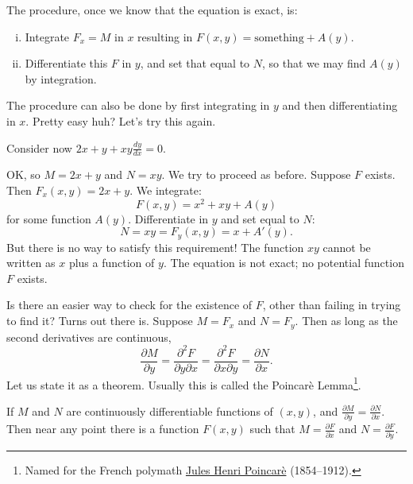 \documentclass[12pt]{book}
\begin{document}
The procedure, once we know that the equation is exact, is:
\begin{enumerate}[(i)]
\item Integrate $F_x = M$ in $x$ resulting in $F(x,y) = \text{something} + A(y)$.
\item Differentiate this $F$ in $y$, and set that equal to
$N$, so that we may find $A(y)$ by integration.
\end{enumerate}
The procedure can also be done by first integrating in $y$ and then
differentiating in $x$.
Pretty easy huh?  Let's try this again.

\begin{example}
Consider now $2x+y + xy \frac{dy}{dx} = 0$.

OK, so $M = 2x+y$ and $N=xy$.  We try to proceed as before.
Suppose 
$F$ exists.  Then $F_x (x,y) = 2x+y$.
We integrate:
\begin{equation*}
F(x,y) = x^2 + xy + A(y)
\end{equation*}
for some function $A(y)$.  Differentiate in $y$ and set equal to $N$:
\begin{equation*}
N = xy = F_y (x,y) = x+A'(y) .
\end{equation*}
But there is no way to satisfy this requirement!  The function $xy$ cannot
be written as $x$ plus a function of $y$.  The equation is not
exact; no potential function $F$ exists.
\end{example}

Is there an easier way to check for the existence of $F$, other than failing
in trying to
find it?  Turns out there is.  Suppose
$M = F_x$ and
$N = F_y$.  Then
as long as the second derivatives are continuous,
\begin{equation*}
\frac{\partial M}{\partial y}
=
\frac{\partial^2 F}{\partial y \partial x}
=
\frac{\partial^2 F}{\partial x \partial y}
=
\frac{\partial N}{\partial x} .
\end{equation*}
Let us state it as
a theorem.  Usually this is called the Poincar\`e Lemma\footnote{Named for the French polymath
\href{http://en.wikipedia.org/wiki/Henri_Poincar\%C3\%A9}{Jules Henri
Poincar\`e} (1854--1912).}.

\begin{theorem}[Poincar\`e]
If $M$ and $N$ are continuously differentiable functions of $(x,y)$, and
$\frac{\partial M}{\partial y} = \frac{\partial N}{\partial x}$.
Then near any point there is a function $F(x,y)$
such that
$M = \frac{\partial F}{\partial x}$ and
$N = \frac{\partial F}{\partial y}$.
\end{theorem}
\end{document}

